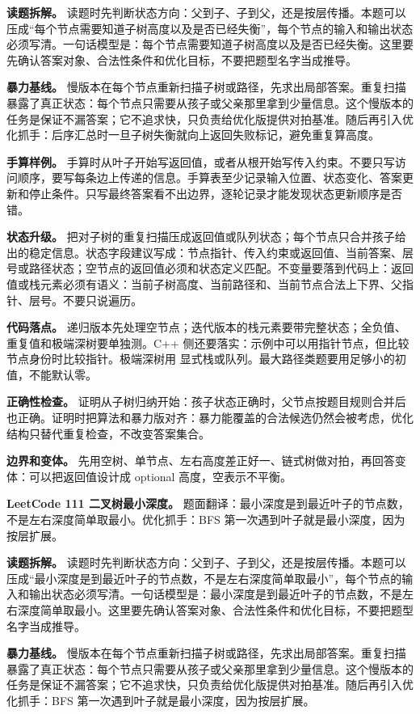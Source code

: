 \textbf{读题拆解。} 读题时先判断状态方向：父到子、子到父，还是按层传播。本题可以压成“每个节点需要知道子树高度以及是否已经失衡”，每个节点的输入和输出状态必须写清。一句话模型是：每个节点需要知道子树高度以及是否已经失衡。这里要先确认答案对象、合法性条件和优化目标，不要把题型名字当成推导。

\textbf{暴力基线。} 慢版本在每个节点重新扫描子树或路径，先求出局部答案。重复扫描暴露了真正状态：每个节点只需要从孩子或父亲那里拿到少量信息。这个慢版本的任务是保证不漏答案；它不追求快，只负责给优化版提供对拍基准。随后再引入优化抓手：后序汇总时一旦子树失衡就向上返回失败标记，避免重复算高度。

\textbf{手算样例。} 手算时从叶子开始写返回值，或者从根开始写传入约束。不要只写访问顺序，要写每条边上传递的信息。手算表至少记录输入位置、状态变化、答案更新和停止条件。只写最终答案看不出边界，逐轮记录才能发现状态更新顺序是否错。

\textbf{状态升级。} 把对子树的重复扫描压成返回值或队列状态；每个节点只合并孩子给出的稳定信息。状态字段建议写成：节点指针、传入约束或返回值、当前答案、层号或路径状态；空节点的返回值必须和状态定义匹配。不变量要落到代码上：返回值或栈元素必须有语义：当前子树高度、当前路径和、当前节点合法上下界、父指针、层号。不要只说遍历。

\textbf{代码落点。} 递归版本先处理空节点；迭代版本的栈元素要带完整状态；全负值、重复值和极端深树要单独测。C++ 侧还要落实：示例中可以用指针节点，但比较节点身份时比较指针。极端深树用  显式栈或队列。最大路径类题要用足够小的初值，不能默认零。

\textbf{正确性检查。} 证明从子树归纳开始：孩子状态正确时，父节点按题目规则合并后也正确。证明时把算法和暴力版对齐：暴力能覆盖的合法候选仍然会被考虑，优化结构只替代重复检查，不改变答案集合。

\textbf{边界和变体。} 先用空树、单节点、左右高度差正好一、链式树做对拍，再回答变体：可以把返回值设计成 optional 高度，空表示不平衡。

\noindent\textbf{LeetCode 111 二叉树最小深度。} 题面翻译：最小深度是到最近叶子的节点数，不是左右深度简单取最小。优化抓手：BFS 第一次遇到叶子就是最小深度，因为按层扩展。

\textbf{读题拆解。} 读题时先判断状态方向：父到子、子到父，还是按层传播。本题可以压成“最小深度是到最近叶子的节点数，不是左右深度简单取最小”，每个节点的输入和输出状态必须写清。一句话模型是：最小深度是到最近叶子的节点数，不是左右深度简单取最小。这里要先确认答案对象、合法性条件和优化目标，不要把题型名字当成推导。

\textbf{暴力基线。} 慢版本在每个节点重新扫描子树或路径，先求出局部答案。重复扫描暴露了真正状态：每个节点只需要从孩子或父亲那里拿到少量信息。这个慢版本的任务是保证不漏答案；它不追求快，只负责给优化版提供对拍基准。随后再引入优化抓手：BFS 第一次遇到叶子就是最小深度，因为按层扩展。

